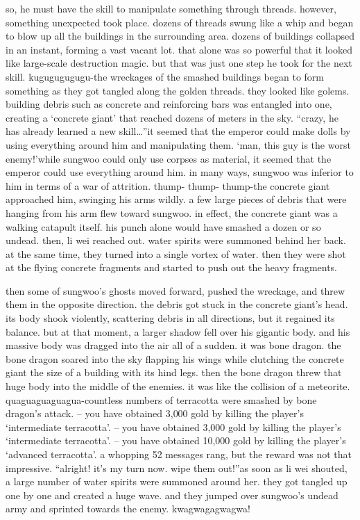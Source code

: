  so, he must have the skill to manipulate something through threads.
however, something unexpected took place.
 dozens of threads swung like a whip and began to blow up all the buildings in the surrounding area.
dozens of buildings collapsed in an instant, forming a vast vacant lot.
 that alone was so powerful that it looked like large-scale destruction magic.
 but that was just one step he took for the next skill.
kugugugugugu-the wreckages of the smashed buildings began to form something as they got tangled along the golden threads.
 they looked like golems.
 building debris such as concrete and reinforcing bars was entangled into one, creating a ‘concrete giant’ that reached dozens of meters in the sky.
“crazy, he has already learned a new skill…”it seemed that the emperor could make dolls by using everything around him and manipulating them.
‘man, this guy is the worst enemy!’while sungwoo could only use corpses as material, it seemed that the emperor could use everything around him.
 in many ways, sungwoo was inferior to him in terms of a war of attrition.
thump- thump- thump-the concrete giant approached him, swinging his arms wildly.
 a few large pieces of debris that were hanging from his arm flew toward sungwoo.
 in effect, the concrete giant was a walking catapult itself.
 his punch alone would have smashed a dozen or so undead.
then, li wei reached out.
 water spirits were summoned behind her back.
 at the same time, they turned into a single vortex of water.
 then they were shot at the flying concrete fragments and started to push out the heavy fragments.


then some of sungwoo’s ghosts moved forward, pushed the wreckage, and threw them in the opposite direction.
the debris got stuck in the concrete giant’s head.
 its body shook violently, scattering debris in all directions, but it regained its balance.
 but at that moment, a larger shadow fell over his gigantic body.
 and his massive body was dragged into the air all of a sudden.
it was bone dragon.
the bone dragon soared into the sky flapping his wings while clutching the concrete giant the size of a building with its hind legs.
then the bone dragon threw that huge body into the middle of the enemies.
 it was like the collision of a meteorite.
quaguaguaguagua-countless numbers of terracotta were smashed by bone dragon’s attack.
– you have obtained 3,000 gold by killing the player’s ‘intermediate terracotta’.
– you have obtained 3,000 gold by killing the player’s ‘intermediate terracotta’.
– you have obtained 10,000 gold by killing the player’s ‘advanced terracotta’.
a whopping 52 messages rang, but the reward was not that impressive.
“alright! it’s my turn now.
 wipe them out!”as soon as li wei shouted, a large number of water spirits were summoned around her.
they got tangled up one by one and created a huge wave.
 and they jumped over sungwoo’s undead army and sprinted towards the enemy.
kwagwagagwagwa!

 